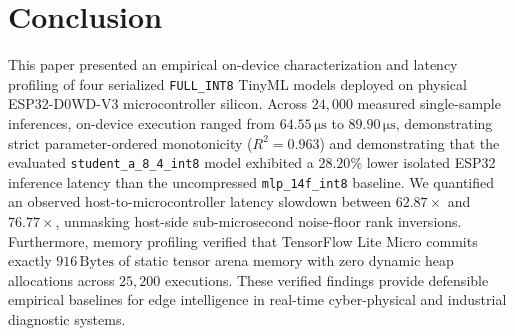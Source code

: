 \documentclass[journal,10pt]{IEEEtran}
\begin{document}
\section{Conclusion}
This paper presented an empirical on-device characterization and latency profiling of four serialized \texttt{FULL\_INT8} TinyML models deployed on physical ESP32-D0WD-V3 microcontroller silicon. Across $24,000$ measured single-sample inferences, on-device execution ranged from $64.55\,\si{\micro\second}$ to $89.90\,\si{\micro\second}$, demonstrating strict parameter-ordered monotonicity ($R^2 = 0.963$) and demonstrating that the evaluated \texttt{student\_a\_8\_4\_int8} model exhibited a $28.20\%$ lower isolated ESP32 inference latency than the uncompressed \texttt{mlp\_14f\_int8} baseline. We quantified an observed host-to-microcontroller latency slowdown between $62.87\times$ and $76.77\times$, unmasking host-side sub-microsecond noise-floor rank inversions. Furthermore, memory profiling verified that TensorFlow Lite Micro commits exactly $916\,\text{Bytes}$ of static tensor arena memory with zero dynamic heap allocations across $25,200$ executions. These verified findings provide defensible empirical baselines for edge intelligence in real-time cyber-physical and industrial diagnostic systems.
\end{document}
